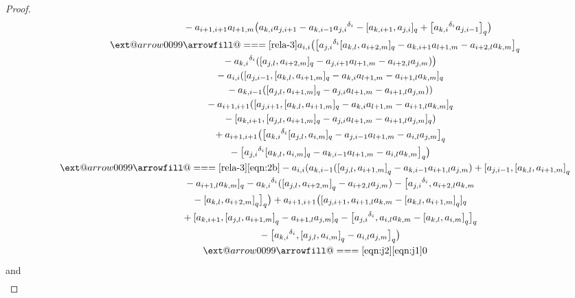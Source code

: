 \documentclass[10pt,a4paper]{amsart}
\makeatletter
\def\x@arrow{\DOTSB\Relbar}
\def\xlongequalsignfill@{\arrowfill@\x@arrow\Relbar\x@arrow}
\providecommand{\xlongequal}[2][]{%
	\ext@arrow 0099\xlongequalsignfill@{#1}{#2}}
\numberwithin{equation}{section}
\def\lr#1{\left[#1\right]}
\def\d{\delta}
\makeatother
\begin{document}
\begin{proof}
\begin{gather*}
 \quad\qquad\qquad\qquad\ \ {} -a_{i+1,i+1}a_{l+1,m} \bigl(a_{k,i}a_{j,i+1}-a_{k,i-1}{a_{j,i}}^{\d_i}- [a_{k,i+1},a_{j,i} ]_q+ \bigl[{a_{k,i}}^{\d_i} a_{j,i-1} \bigr]_q \bigr)\\
 \quad\qquad\xlongequal{\eqref{rela-3}} a_{i,i} \bigl( \bigl[{a_{j,i}}^{\d_i} [a_{k,l},a_{i+2,m} ]_q -a_{k,i+1}a_{l+1,m}-a_{i+2,l}a_{k,m} \bigr]_q \\[-0.5mm]
\quad\qquad\qquad\quad {} -{a_{k,i}}^{\d_i} ( [a_{j,l},a_{i+2,m} ]_q
-a_{j,i+1}a_{l+1,m} {}-a_{i+2,l}a_{j,m} ) \bigr)\\
 \quad\qquad\qquad\quad {}-a_{i,i} ( [a_{j,i-1}, [a_{k,l},a_{i+1,m} ]_q
-a_{k,i}a_{l+1,m} -a_{i+1,l}a_{k,m} ]_q \\
\quad\qquad\qquad\quad {}-a_{k,i-1} ( [a_{j,l},a_{i+1,m} ]_q-a_{j,i}a_{l+1,m} -a_{i+1,l}a_{j,m} ) )\\
 \quad\qquad\qquad\quad {}-a_{i+1,i+1} ( [a_{j,i+1}, [a_{k,l},a_{i+1,m} ]_q-a_{k,i} a_{l+1,m}-a_{i+1,l}a_{k,m} ]_q \\
\quad\qquad\qquad \quad {}- [a_{k,i+1}, [a_{j,l},a_{i+1,m} ]_q-a_{j,i}a_{l+1,m} -a_{i+1,l}a_{j,m} ]_q )\\
 \quad\qquad\qquad \quad {}+a_{i+1,i+1} \bigl( \bigl[{a_{k,i}}^{\d_i} [a_{j,l},a_{i,m} ]_q -a_{j,i-1}a_{l+1,m}-a_{i,l}a_{j,m} \bigr]_q \\
\quad\qquad\qquad\quad {}- \bigl[{a_{j,i}}^{\d_i} [a_{k,l},a_{i,m} ]_q-a_{k,i-1}a_{l+1,m} -a_{i,l}a_{k,m} \bigr]_q \bigr)\\[-0.5mm]
\quad\qquad \xlongequal[\eqref{rela-3}]{\eqref{eqn:2b}} - a_{i,i} (a_{k,i-1}(\lr{a_{j,l}, a_{i+1,m}}_q-a_{k,i-1}a_{i+1,l}a_{j,m})+[a_{j,i-1}, \lr{a_{k,l},a_{i+1,m}}_q\\[-0.5mm]
\quad\qquad\qquad \quad {}-a_{i+1,l}a_{k,m}]_q -{a_{k,i}}^{\d_i}(\lr{a_{j,l},a_{i+2,m}}_q-a_{i+2,l}a_{j,m})-\bigl[{a_{j,i}}^{\d_i}, a_{i+2,l}a_{k,m}\\
 \quad\qquad\qquad\quad {}-\lr{a_{k,l},a_{i+2,m}}_q\bigr]_q \bigr)+a_{i+1,i+1} \bigl([a_{j,i+1}, a_{i+1,l}a_{k,m} -\lr{a_{k,l},a_{i+1,m}}_q]_q \\
\quad\qquad\qquad\quad {}+[a_{k,i+1},\lr{a_{j,l},a_{i+1,m}}_q -a_{i+1,l}a_{j,m}]_q -\bigl[{a_{j,i}}^{\d_i},a_{i,l}a_{k,m}-\lr{a_{k,l},a_{i,m}}_q\bigr]_q \\
\quad\qquad\qquad\quad {}-\bigl[{a_{k,i}}^{\d_i},\lr{a_{j,l},a_{i,m}}_q-a_{i,l}a_{j,m}\bigr]_q \bigr)\\[-0.5mm]
\quad\qquad \xlongequal[\eqref{eqn:j2}]{\eqref{eqn:j1}} 0
\end{gather*}
and
\begin{gather*}

\end{gather*}
\end{proof}
\end{document}
